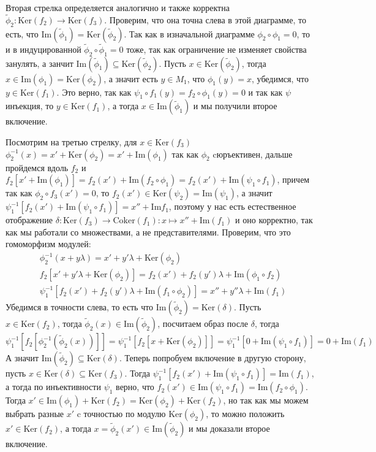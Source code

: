 \documentclass{article}
\begin{document}
\begin{enumerate}
        Вторая стрелка определяется аналогично и также корректна $\widetilde\phi_2:\text{Ker}(f_2)\rightarrow
        \text{Ker}(f_3)$. Проверим, что она точна слева в этой диаграмме, то есть, что $\text{Im}(\widetilde
        \phi_1)=\text{Ker}(\widetilde\phi_2)$. Так как в изначальной диаграмме $\phi_2\circ\phi_1=0$,
        то и в индуцированной $\widetilde\phi_2\circ\widetilde\phi_1=0$ тоже, так как ограничение не изменяет
        свойства занулять, а занчит $\text{Im}(\widetilde\phi_1)\subseteq\text{Ker}(\widetilde\phi_2)$.
        Пусть $x\in\text{Ker}(\widetilde\phi_2)$, тогда $x\in\text{Im}(\phi_1)=\text{Ker}(\phi_2)$, а значит
        есть $y\in M_1$, что $\phi_1(y)=x$, убедимся, что $y\in\text{Ker}(f_1)$. Это верно, так как
        $\psi_1\circ f_1(y)=f_2\circ\phi_1(y)=0$ и так как $\psi$ инъекция, то $y\in\text{Ker}(f_1)$, а
        тогда $x\in\text{Im}(\widetilde\phi_1)$ и мы получили второе включение.

        Посмотрим на третью стрелку, для $x\in\text{Ker}(f_3)$ $\phi_2^{-1}(x)=x'+\text{Ker}(\phi_2)=x'+
        \text{Im}(\phi_1)$ так как $\phi_2$ cюръективен, дальше пройдемся вдоль $f_2$ и $f_2[x'+\text{Im}(\phi_1)]=f_2(x')+\text{Im}(f_2\circ\phi_1)
        =f_2(x')+\text{Im}(\psi_1\circ f_1)$, причем так как $\phi_2\circ f_3(x')=0$, то $f_2(x')\in\text{Ker}(\psi_2)=
        \text{Im}(\psi_1)$, а значит $\psi_1^{-1}[f_2(x')+\text{Im}(\psi_1\circ f_1)]=x''+\text{Im}{f_1}$, поэтому у нас
        есть естественное отображение $\delta: \text{Ker}(f_3)\rightarrow\text{Coker}(f_1):x\mapsto x''+\text{Im}(f_1)$ и оно корректно,
        так как мы работали со множествами, а не представителями. Проверим, что это гомоморфизм модулей:
        \begin{align*}
            &\phi_2^{-1}(x+y\lambda)=x'+y'\lambda+\text{Ker}(\phi_2)\\
            &f_2[x'+y'\lambda+\text{Ker}(\phi_2)]=f_2(x')+f_2(y')\lambda+\text{Im}(\phi_1\circ f_2)\\
            &\psi_1^{-1}[f_2(x')+f_2(y')\lambda+\text{Im}(f_1\circ\phi_2)]=x''+y''\lambda+\text{Im}(f_1)
        \end{align*}
        Убедимся в точности слева, то есть что $\text{Im}(\widetilde\phi_2)=\text{Ker}(\delta)$. Пусть $x\in\text{Ker}(f_2)$,
        тогда $\widetilde\phi_2(x)\in\text{Im}(\widetilde\phi_2)$, посчитаем образ после $\delta$, тогда
        \[\psi_1^{-1}[f_2[\phi_2^{-1}(\widetilde\phi_2(x))]]=\psi_1^{-1}[f_2[x+\text{Ker}(\phi_2)]]=\psi_1^{-1}[0+\text{Im}(\psi_1\circ f_1)]=0+\text{Im}(f_1)\]
        А значит $\text{Im}(\widetilde\phi_2)\subseteq\text{Ker}(\delta)$. Теперь попробуем включение в другую сторону, пусть
        $x\in\text{Ker}(\delta)\subseteq\text{Ker}(f_3)$. Тогда $\psi_1^{-1}[f_2(x')+\text{Im}(\psi_1\circ f_1)]=\text{Im}(f_1)$,
        а тогда по инъективности $\psi_1$ верно, что $f_2(x')\in\text{Im}(\psi_1\circ f_1)=\text{Im}(f_2\circ \phi_1)$. Тогда
        $x'\in\text{Im}(\phi_1)+\text{Ker}(f_2)=\text{Ker}(\phi_2)+\text{Ker}(f_2)$, но так как мы можем выбрать разные $x'$ c
        точностью по модулю $\text{Ker}(\phi_2)$, то можно положить $x'\in\text{Ker}(f_2)$, а тогда $x=\widetilde\phi_2(x')\in
        \text{Im}(\widetilde\phi_2)$ и мы доказали второе включение.


\end{enumerate}
\end{document}
